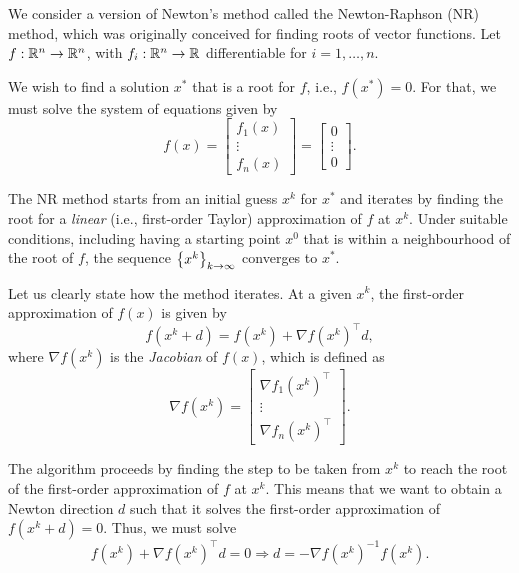 We consider a version of Newton's method called the Newton-Raphson (NR) method, which was originally conceived for finding roots of vector functions. Let $f: \mathbb{R}^n \to \mathbb{R}^n$, with $f_i : \mathbb{R}^n \to \mathbb{R}$ differentiable for $i = 1,\dots,n$.

We wish to find a solution $x^*$ that is a root for $f$, i.e., $f(x^*) = 0$. For that, we must solve the system of equations given by
	$$ 
	f(x) = \begin{bmatrix} f_1(x) \\ \vdots \\ f_n(x) \end{bmatrix} = \begin{bmatrix} 0 \\ \vdots \\ 0 \end{bmatrix}.
	$$
	
The NR method starts from an initial guess $x^k$ for $x^*$ and iterates by finding the root for a \emph{linear} (i.e., first-order Taylor) approximation of $f$ at $x^k$. Under suitable conditions, including having a starting point $x^0$ that is within a neighbourhood of the root of $f$, the sequence $\left\{ x^k \right \}_{k\to\infty}$ converges to $x^*$.

Let us clearly state how the method iterates. At a given $x^k$, the first-order approximation of $f(x)$ is given by
	$$ 
	f(x^k + d) = f(x^k) + \nabla f(x^k)^\top d,
	$$
	where $\nabla f(x^k)$ is the \emph{Jacobian} of $f(x)$, which is defined as
	$$ 
	\nabla f(x^k) = \begin{bmatrix} \nabla f_1(x^k)^\top \\ \vdots \\ \nabla f_n(x^k)^\top \end{bmatrix}. 
	$$
	
The algorithm proceeds by finding the step to be taken from $x^k$ to reach the root of the first-order approximation of $f$ at $x^k$. This means that we want to obtain a Newton direction $d$ such that it solves the first-order approximation of $f(x^k + d) = 0$. Thus, we must solve
	\begin{equation*}
		f(x^k) + \nabla f(x^k)^\top d = 0 \Rightarrow
		d = -\nabla f(x^k)^{-1}f(x^k).
	\end{equation*}
	
	
